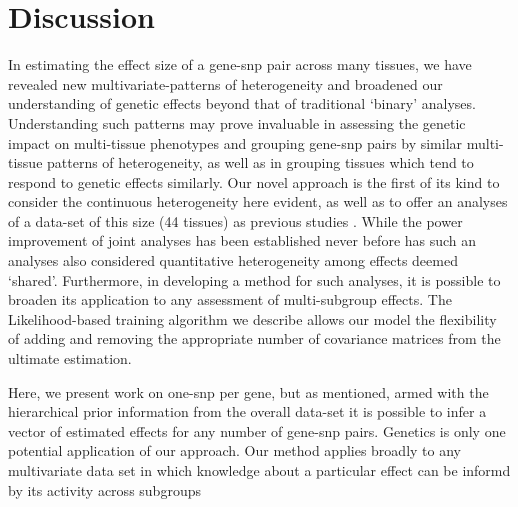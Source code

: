 \section{Discussion}

In estimating the effect size of a gene-snp pair across many tissues, we have revealed new multivariate-patterns of heterogeneity and broadened our understanding of genetic effects beyond that of traditional `binary' analyses. Understanding such patterns may prove invaluable in assessing the genetic impact on multi-tissue phenotypes and grouping gene-snp pairs by similar multi-tissue patterns of heterogeneity, as well as in grouping tissues which tend to respond to genetic effects similarly. Our novel approach is the first of its kind to consider the continuous heterogeneity here evident, as well as to offer an analyses of a data-set of this size (44 tissues) as previous studies \cite{consortium_genotype-tissue_2015}. While the power improvement of joint analyses has been established \cite{flutre_statistical_2013} never before has such an analyses also considered quantitative heterogeneity among effects deemed `shared'. Furthermore, in developing a method for such analyses, it is possible to broaden its application to any assessment of multi-subgroup effects. The Likelihood-based training algorithm we describe allows our model the flexibility of adding and removing the appropriate  number of covariance matrices from the ultimate estimation.

Here, we present work on one-snp per gene, but as mentioned, armed with the hierarchical prior information from the overall data-set it is possible to infer a vector of estimated effects for any number of gene-snp pairs. Genetics is only one potential application of our approach. Our method applies broadly to any multivariate data set in which knowledge about a particular effect can be informd by its activity across subgroups